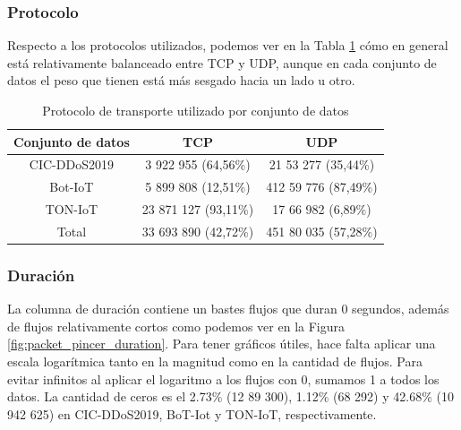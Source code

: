 \subsubsection{Protocolo}

Respecto a los protocolos utilizados, podemos ver en la Tabla \ref{table:packetpincerasprotocols} cómo en general está relativamente balanceado entre TCP y UDP, aunque en cada conjunto de datos el peso que tienen está más sesgado hacia un lado u otro.

\begin{table}[H]
    \centering
    \begin{tabular}{|c | c c |}
        \hline
        \textbf{Conjunto de datos} & \textbf{TCP}          & \textbf{UDP}         \\  \hline
        CIC-DDoS2019               &  3 922 955  (64,56\%) &  21 53 277 (35,44\%) \\
        Bot-IoT                    &  5 899 808  (12,51\%) & 412 59 776 (87,49\%) \\
        TON-IoT                    & 23 871 127  (93,11\%) &  17 66 982 (6,89\%)  \\
        Total                      & 33 693 890  (42,72\%) & 451 80 035 (57,28\%) \\
        \hline
    \end{tabular}
    \caption{Protocolo de transporte utilizado por conjunto de datos}
    \label{table:packetpincerasprotocols}
\end{table}

\subsubsection{Duración}

La columna de duración contiene un bastes flujos que duran 0 segundos, además de flujos relativamente cortos como podemos ver en la Figura \ref{fig:packet_pincer_duration}.  Para tener gráficos útiles, hace falta aplicar una escala logarítmica tanto en la magnitud como en la cantidad de flujos. Para evitar infinitos al aplicar el logaritmo a los flujos con 0, sumamos 1 a todos los datos. La cantidad de ceros es el 2.73\% (12 89 300), 1.12\% (68 292) y 42.68\% (10 942 625) en CIC-DDoS2019, BoT-Iot y TON-IoT, respectivamente.

